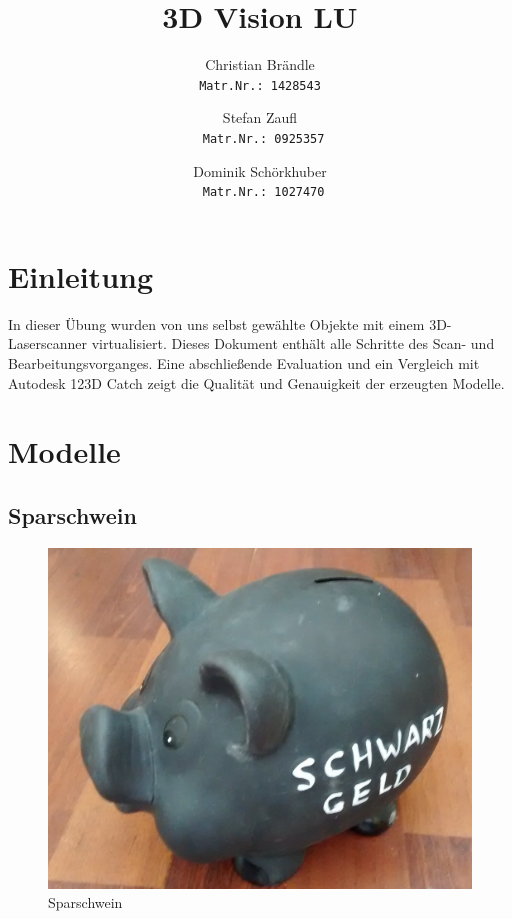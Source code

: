 \documentclass[]{article}
\title{3D Vision LU}
\author{Christian Br\"andle \\
\texttt{Matr.Nr.: 1428543}
\and Stefan Zaufl \\
\texttt{ Matr.Nr.: 0925357}
\and Dominik Sch\"orkhuber\\
\texttt{ Matr.Nr.: 1027470}}
\begin{document}
\maketitle


\section{Einleitung}  %
In dieser Übung wurden von uns selbst gewählte Objekte mit einem 3D-Laserscanner virtualisiert. Dieses Dokument enthält alle Schritte des Scan- und Bearbeitungsvorganges. Eine abschließende Evaluation und ein Vergleich mit Autodesk 123D Catch zeigt die Qualität und Genauigkeit der erzeugten Modelle. 

\section{Modelle}
\subsection{}
\subsection{}
\subsection{Sparschwein}
\begin{figure}[!h]
\caption{Sparschwein}
\centering
\includegraphics[scale=0.25]{images/sparschwein/photo.jpg}
\end{figure}
\end{document}
